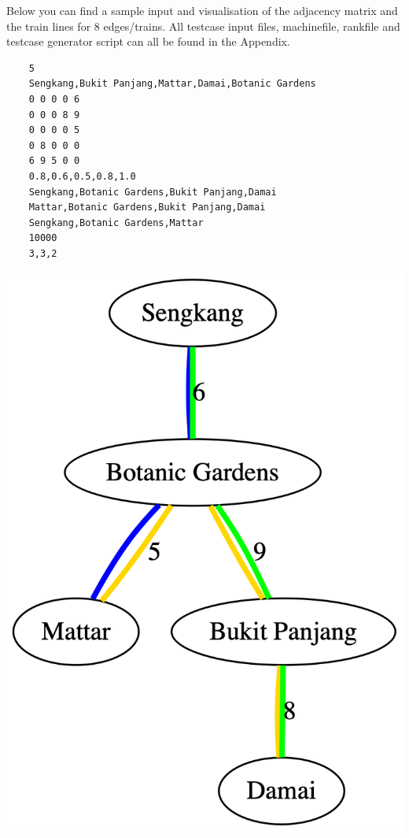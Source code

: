 \documentclass[a4paper,12pt]{article}
\begin{document}
Below you can find a sample input and visualisation of the adjacency matrix and the train lines for 8 edges/trains. All testcase input files, machinefile, rankfile and testcase generator script can all be found in the Appendix.

\begin{center}
	\begin{minipage}{.65\textwidth}
		\centering
		\begin{verbatim}
    5
    Sengkang,Bukit Panjang,Mattar,Damai,Botanic Gardens
    0 0 0 0 6
    0 0 0 8 9
    0 0 0 0 5
    0 8 0 0 0
    6 9 5 0 0
    0.8,0.6,0.5,0.8,1.0
    Sengkang,Botanic Gardens,Bukit Panjang,Damai
    Mattar,Botanic Gardens,Bukit Panjang,Damai
    Sengkang,Botanic Gardens,Mattar
    10000
    3,3,2
    \end{verbatim}
	\end{minipage}
	\begin{minipage}{0.33\textwidth}
		\centering
		\includegraphics[width=\linewidth]{map}
	\end{minipage}
\end{center}
\newpage
\end{document}
